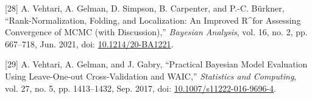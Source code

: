 \documentclass[11pt]{article}
\begin{document}
\hypertarget{citeproc_bib_item_28}{[28] A. Vehtari, A. Gelman, D. Simpson, B. Carpenter, and P.-C. Bürkner, “Rank-Normalization, Folding, and Localization: An Improved R\textasciicircum for Assessing Convergence of MCMC (with Discussion),” \textit{Bayesian Analysis}, vol. 16, no. 2, pp. 667–718, Jun. 2021, doi: \href{https://doi.org/10.1214/20-BA1221}{10.1214/20-BA1221}.}

\hypertarget{citeproc_bib_item_29}{[29] A. Vehtari, A. Gelman, and J. Gabry, “Practical Bayesian Model Evaluation Using Leave-One-out Cross-Validation and WAIC,” \textit{Statistics and Computing}, vol. 27, no. 5, pp. 1413–1432, Sep. 2017, doi: \href{https://doi.org/10.1007/s11222-016-9696-4}{10.1007/s11222-016-9696-4}.}
\end{document}
